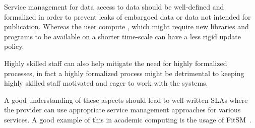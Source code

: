\documentclass[12pt,a4paper]{article}
\newcommand{\cmark}{\ding{51}}%
\newcommand{\xmark}{\ding{55}}%
\newcommand{\SP}{\cellcolor{green!75} \bf \cmark} %
\newcommand{\MP}{\cellcolor{green!50} \bf \cmark} %
\newcommand{\NU}{\cellcolor{yellow!25} \bf --} %
\newcommand{\MN}{\cellcolor{red!50} \bf \xmark} %
\newcommand{\SN}{\cellcolor{red!75} \bf \xmark} %
\newcommand{\SP}{\cellcolor{blue!75} \bf \hspace{\facc\colwid}\cmark} %
\newcommand{\MP}{\cellcolor{blue!25} \bf \hspace{\facc\colwid}\cmark} %
\newcommand{\NU}{\cellcolor{yellow!25} \bf \hspace{\facc\colwid}--} %
\newcommand{\MN}{\cellcolor{red!25} \bf \hspace{\facc\colwid}\xmark} %
\newcommand{\SN}{\cellcolor{red!75} \bf \hspace{\facc\colwid}\xmark} %
\begin{document}
Service management for data access to data should be well-defined and formalized in order to prevent leaks of embargoed data or data not intended for publication.
Whereas the user compute \einfra, which might require new libraries and programs to be available on a shorter time-scale can have a less rigid update policy.

Highly skilled staff can also help mitigate the need for highly formalized processes, in fact a highly formalized process might be detrimental to keeping highly skilled staff motivated and eager to work with the systems.

A good understanding of these aspects should lead to well-written SLAs where the provider can use appropriate service management approaches for various services.
A good example of this in academic computing is the usage of FitSM~\cite{fitsm}.

\end{document}
